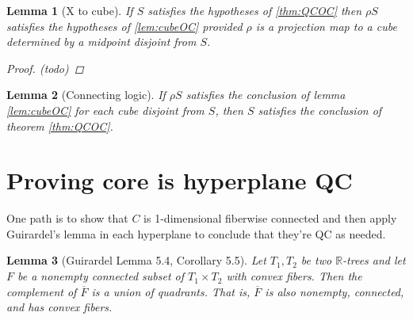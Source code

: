 \documentclass{article}
\theoremstyle{mystyle}
\newtheorem{lem}{Lemma}[section]
\theoremstyle{remark}
\begin{document}
\begin{lem}
	[\label{lem:Xtocube}X to cube]
	If \(S\) satisfies the hypotheses of \ref{thm:QCOC} then \(\rho S\) satisfies the hypotheses of \ref{lem:cubeOC} provided \(\rho\) is a projection map to a cube determined by a midpoint disjoint from \(S\).
\begin{proof}
	(todo)	
\end{proof}
\end{lem}

\begin{lem}
	[Connecting logic]
	If \(\rho S\) satisfies the conclusion of lemma \ref{lem:cubeOC} for each cube disjoint from \(S\), then \(S\) satisfies the conclusion of theorem \ref{thm:QCOC}.
\end{lem}


\section{Proving core is hyperplane QC}
One path is to show that \(C\) is 1-dimensional fiberwise connected and then apply Guirardel's lemma in each hyperplane to conclude that they're QC as needed.

\begin{lem}
	[Guirardel Lemma 5.4, Corollary 5.5]
	Let \(T_{1} , T_{2}\) be two \(\mathbb{R}\)-trees and let \(F\) be a nonempty connected subset of \(T_{1} \times T_{2}\) with convex fibers. Then the complement of \(\overline{F}\) is a union of quadrants. That is, \(\overline{F}\) is also nonempty, connected, and has convex fibers.
\end{lem}
\end{document}
